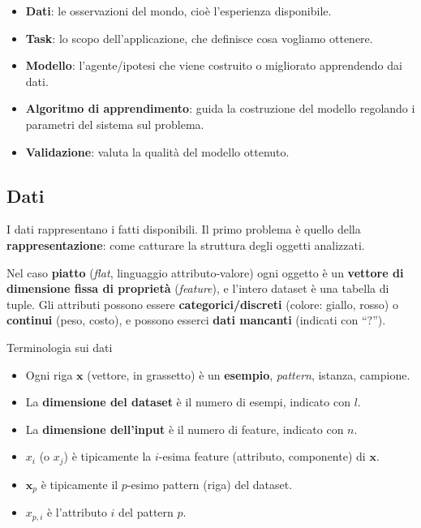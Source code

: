 \begin{itemize}
\tightlist
\item
  \textbf{Dati}: le osservazioni del mondo, cioè l'esperienza
  disponibile.
\item
  \textbf{Task}: lo scopo dell'applicazione, che definisce cosa vogliamo
  ottenere.
\item
  \textbf{Modello}: l'agente/ipotesi che viene costruito o migliorato
  apprendendo dai dati.
\item
  \textbf{Algoritmo di apprendimento}: guida la costruzione del modello
  regolando i parametri del sistema sul problema.
\item
  \textbf{Validazione}: valuta la qualità del modello ottenuto.
\end{itemize}

\subsection{Dati}\label{dati}

I dati rappresentano i fatti disponibili. Il primo problema è quello
della \textbf{rappresentazione}: come catturare la struttura degli
oggetti analizzati.

Nel caso \textbf{piatto} (\emph{flat}, linguaggio attributo-valore) ogni
oggetto è un \textbf{vettore di dimensione fissa di proprietà}
(\emph{feature}), e l'intero dataset è una tabella di tuple. Gli
attributi possono essere \textbf{categorici/discreti} (colore: giallo,
rosso) o \textbf{continui} (peso, costo), e possono esserci \textbf{dati
mancanti} (indicati con ``?'').

\begin{boxnote}{Terminologia sui dati}

\begin{itemize}
\tightlist
\item
  Ogni riga \(\mathbf{x}\) (vettore, in grassetto) è un
  \textbf{esempio}, \emph{pattern}, istanza, campione.
\item
  La \textbf{dimensione del dataset} è il numero di esempi, indicato con
  \(l\).
\item
  La \textbf{dimensione dell'input} è il numero di feature, indicato con
  \(n\).
\item
  \(x_i\) (o \(x_j\)) è tipicamente la \(i\)-esima feature (attributo,
  componente) di \(\mathbf{x}\).
\item
  \(\mathbf{x}_p\) è tipicamente il \(p\)-esimo pattern (riga) del
  dataset.
\item
  \(x_{p,i}\) è l'attributo \(i\) del pattern \(p\).
\end{itemize}

\end{boxnote}


